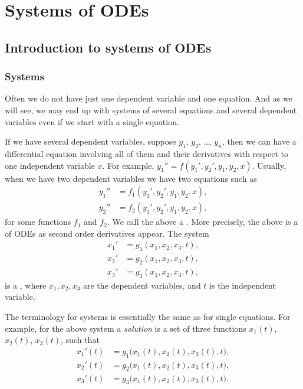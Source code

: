 \chapter{Systems of ODEs} \label{sys:chapter}


\section{Introduction to systems of ODEs} \label{sec:introtosys}


\subsection{Systems}

Often we do not have just one dependent variable and one equation.
And as we will see, we may end up with systems of several
equations and several dependent variables even if we start with a single
equation.

If we have several dependent variables,
suppose $y_1$, $y_2$, \ldots, $y_n$,
then
we can have a differential equation involving all of them and their
derivatives with respect to one independent variable $x$.
For example, $y_1'' = f(y_1',y_2',y_1,y_2,x)$.
Usually, when we have two dependent variables we have two equations
such as
\begin{align*}
y_1'' & = f_1(y_1',y_2',y_1,y_2,x) , \\
y_2'' & = f_2(y_1',y_2',y_1,y_2,x) ,
\end{align*}
for some functions $f_1$ and $f_2$.  We call the above a
\emph{}.
More precisely, the above is a \emph{}
of ODEs as second
order derivatives appear.
The system
\begin{align*}
x_1' & = g_1(x_1,x_2,x_3,t) , \\
x_2' & = g_2(x_1,x_2,x_3,t) , \\
x_3' & = g_3(x_1,x_2,x_3,t) ,
\end{align*}
is a \emph{}, where $x_1,x_2,x_3$ are
the dependent variables,
and $t$ is the independent variable.

The terminology for systems is essentially the same as for
single equations.
For example, for the above system a
\emph{solution}
is a set of three functions $x_1(t)$, $x_2(t)$, $x_3(t)$, such that
\begin{align*}
x_1'(t) &= g_1\bigl(x_1(t),x_2(t),x_3(t),t\bigr) , \\
x_2'(t) &= g_2\bigl(x_1(t),x_2(t),x_3(t),t\bigr) , \\
x_3'(t) &= g_3\bigl(x_1(t),x_2(t),x_3(t),t\bigr) .
\end{align*}

